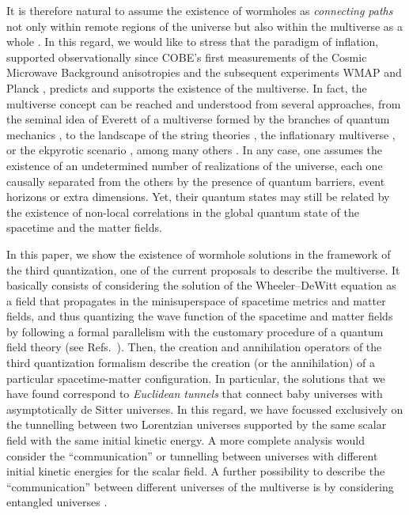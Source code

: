 \documentclass[aps,nofootinbib,prd,superscriptaddress,eqsecnum,showpacs,showkeys,preprintnumbers,altaffilletter]{revtex4}
\begin{document}
It is therefore natural to assume the existence of wormholes as {\textit{connecting paths}} not only within remote regions of the universe but also within the multiverse as a whole \cite{PFGD2011}. In this regard, we would like to stress that the paradigm of inflation, supported observationally since COBE's first measurements \cite{Mather:1993ij} of the Cosmic Microwave Background anisotropies and the subsequent experiments WMAP \cite{Hinshaw:2012aka} and Planck \cite{Ade:2015xua}, predicts and supports the existence of the multiverse. In fact, the multiverse concept can be reached and understood from several approaches, from the seminal idea of Everett of a multiverse formed by the branches of quantum mechanics \cite{Everett1957}, to the landscape of the string theories \cite{Susskind2003}, the inflationary multiverse \cite{Linde1983, Linde1986}, or the ekpyrotic scenario \cite{Khoury2001, Steinhard2002}, among many others \cite{Carr2007, Smolin1997, Tegmark2003, Freivogel2004, Mersini2008b, Mersini2008a, mariam2007, RP2007b, Alonso2012}. In any case, one assumes the existence of an undetermined number of realizations of the universe, each one causally separated from the others by the presence of quantum barriers, event horizons or extra dimensions. Yet, their quantum states may still be related by the existence of non-local correlations in the global quantum state of the spacetime and the matter fields.


In this paper, we show the existence of wormhole solutions in the framework of the third quantization, one of the current proposals to describe the multiverse. It basically consists of considering the solution of the Wheeler--DeWitt equation as a field that propagates in the minisuperspace of spacetime metrics and matter fields, and thus quantizing the wave function of the spacetime and matter fields by following a formal parallelism with the customary procedure of a quantum field theory (see Refs.~\cite{Caderni1984, McGuian1988, Strominger1990, RP2010}). Then, the creation and annihilation operators of the third quantization formalism describe the creation (or the annihilation) of a particular spacetime-matter  configuration. In particular, the solutions that we have found correspond to {\it{Euclidean tunnels}} that connect baby universes with asymptotically de Sitter universes. In this regard, we have focussed exclusively on the tunnelling between two Lorentzian universes supported by the same scalar field with the same initial kinetic energy. A more complete analysis would consider the ``communication'' or tunnelling between universes with different initial kinetic energies for the scalar field. A further possibility to describe the ``communication'' between different universes of the multiverse is by considering entangled universes \cite{cyclic,salva2017}.
\end{document}
